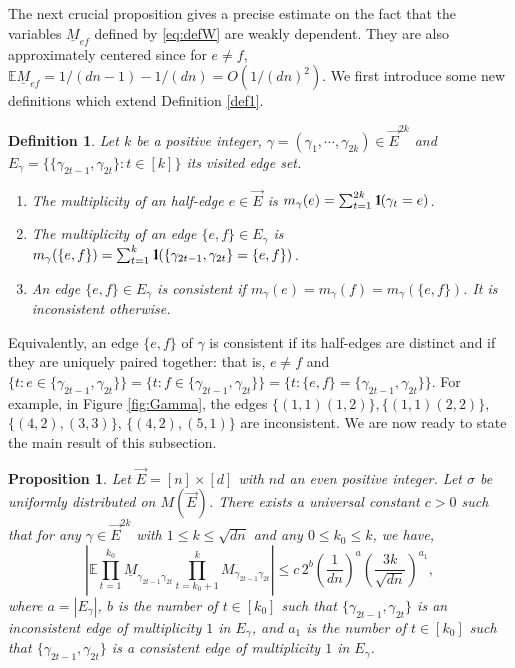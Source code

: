 \documentclass[11pt]{article}
\newtheorem{proposition}[lemma]{Proposition}
\newtheorem{definition}[lemma]{Definition}
\newcommand{\dE}{\mathbb {E}}
\newcommand{\cE}{E}
\newcommand{\ABS}[1]{{{\left| #1 \right|}}} %
\newcommand{\PAR}[1]{{{\left(#1\right)}}} %
\newcommand{\1}{1\!\!{\sf I}}\newcommand{\IND}{\1}
\begin{document}
The next crucial proposition gives a precise estimate on the fact that the variables $\underline M_{ef}$ defined by \eqref{eq:defW} are weakly dependent. They are also approximately centered since for $e\ne f$, $\dE \underline M_{ef}= 1 / (dn-1)- 1 / (dn) = O (1 / (dn)^2)$.  We first introduce some new definitions which extend Definition \ref{def1}.
\begin{definition}\label{def:defcons}
Let $k$ be a positive integer, $\gamma = ( \gamma_1, \cdots , \gamma_{2k}) \in \vec E^{2k}$ and $E_\gamma = \{ \{ \gamma_{2t-1}, \gamma_{2t} \} :  t \in [k]\}$ its visited edge set. 

\begin{enumerate}[-]
\item
The {\em multiplicity} of an half-edge $e \in \vec E $ is $m_\gamma (e) = \sum_{t=1}^{2k} \IND ( \gamma_t  = e )$. 

\item
The {\em multiplicity} of an edge $\{e, f\} \in \cE_\gamma$ is $m_{\gamma} ( \{ e,f\} )  = \sum_{t=1}^k  \IND ( \{ \gamma_{2t-1}, \gamma_{2t}\} = \{e, f\} )$. 

\item
An edge  $\{e, f\} \in \cE_\gamma$ is {\em consistent} if  $m_\gamma (e) = m_{\gamma} (f) = m_{\gamma} (\{ e, f \})$.  It is inconsistent otherwise. 
\end{enumerate}
\end{definition}

Equivalently, an edge $\{e,f\}$ of $\gamma$ is consistent if its half-edges are distinct and if they are uniquely paired together: that is, $e \ne f$ and $\{ t : e \in \{ \gamma_{2t-1}, \gamma_{2t}  \} \} =  \{ t : f \in \{ \gamma_{2t-1}, \gamma_{2t}  \} \}  = \{ t : \{ e , f\} =\{ \gamma_{2t-1}, \gamma_{2t}  \} \} $. For example, in Figure \ref{fig:Gamma}, the edges $\{ (1,1)(1,2) \}, \{ (1,1)(2,2) \}$, $\{(4,2),(3,3)\}$, $\{(4,2),(5,1)\}$ are inconsistent. We are now ready to state the main result of this subsection. 
\begin{proposition}
\label{le:exppath}
Let $\vec E = [n] \times [d]$ with $nd$ an even positive integer. Let $\sigma$ be uniformly distributed on $M(\vec E)$. There exists a universal constant $c >0$ such that for any $ \gamma \in \vec E^{2k}$ with $1 \leq k \leq \sqrt{dn}$ and any $0 \leq k_0 \leq k$, we have, 
$$
\ABS{ \dE \prod_{t= 1} ^{k_0}  \underline M_{\gamma_{2t-1} \gamma_{2t} } \prod_{t= k_0+1} ^{k}  M_{\gamma_{2t-1} \gamma_{2t} }  } \leq c\, 2^{b} \PAR{ \frac{1 }{ dn }}^{a} \PAR{ \frac{  3k   }{ \sqrt{dn} }}^{a_1}, 
$$ 
where $a = | \cE_\gamma |$,  $b$  is the number of  $t \in [k_0]$ such that $\{ \gamma_{2t-1}, \gamma_{2t}\}$ is an inconsistent edge of multiplicity $1$ in $\cE_\gamma$,  and $a_1$ is the number of  $t \in [k_0]$ such that $\{ \gamma_{2t-1}, \gamma_{2t}\}$ is a consistent edge of multiplicity $1$ in $\cE_\gamma$.\end{proposition}
\end{document}
